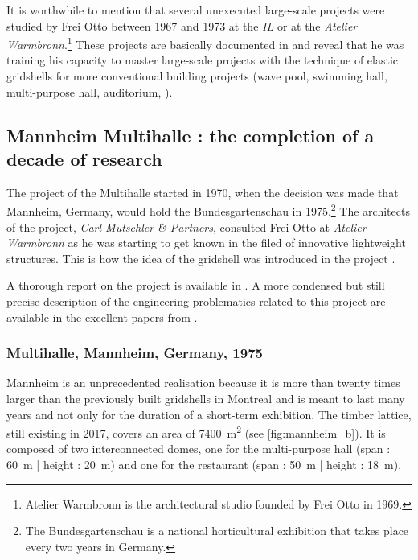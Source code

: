 It is worthwhile to mention that several unexecuted large-scale projects were studied by Frei Otto between 1967 and 1973 at the \emph{IL} or at the \emph{Atelier Warmbronn}.\footnote{Atelier Warmbronn is the architectural studio founded by Frei Otto in 1969.} These projects are basically documented in \cite[pp.~278 - 288]{IL10} and reveal that he was training his capacity to master large-scale projects with the technique of elastic gridshells for more conventional building projects (wave pool, swimming hall, multi-purpose hall, auditorium, \telp{}).


\subsection{Mannheim Multihalle : the completion of a decade of research}
The project of the Multihalle started in 1970, when the decision was made that Mannheim, Germany, would hold the Bundesgartenschau in 1975.\footnote{The Bundesgartenschau is a national horticultural exhibition that takes place every two years in Germany.} The architects of the project, \emph{Carl Mutschler \& Partners}, consulted Frei Otto at \emph{Atelier Warmbronn} as he was starting to get known in the filed of innovative lightweight structures. This is how the idea of the gridshell was introduced in the project \cite{Liddell2015}.

A thorough report on the project is available in \cite{IL13}.  A more condensed but still precise description of the engineering problematics related to this project are available in the excellent papers from \citet{Happold1975, Liddell2015}.

\subsubsection{Multihalle, Mannheim, Germany, 1975}
Mannheim is an unprecedented realisation because it is more than twenty times larger than the previously built gridshells in Montreal and is meant to last many years and not only for the duration of a short-term exhibition. The timber lattice, still existing in 2017,  covers an area of \SI{7400}{m^2} (see \cref{fig:mannheim_b}). It is composed of two interconnected domes, one for the multi-purpose hall (span : \SI{60}{m} | height : \SI{20}{m}) and one for the restaurant (span : \SI{50}{m} | height : \SI{18}{m}).

